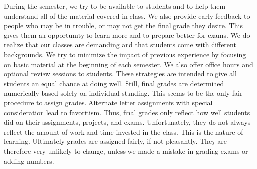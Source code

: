 \documentclass[letterpaper,11pt]{article}
\begin{document}
During the semester, we try to be available to students and to help them understand all of the material covered in class.
We also provide early feedback to people who may be in trouble, or may not get the final grade they desire.
This gives them an opportunity to learn more and to prepare better for exams.
We do realize that our classes are demanding and that students come with different backgrounds.
We try to minimize the impact of previous experience by focusing on basic material at the beginning of each semester.
We also offer office hours and optional review sessions to students.
These strategies are intended to give all students an equal chance at doing well.
Still, final grades are determined numerically based solely on individual standing.
This seems to be the only fair procedure to assign grades.
Alternate letter assignments with special consideration lead to favoritism.
Thus, final grades only reflect how well students did on their assignments, projects, and exams.
Unfortunately, they do not always reflect the amount of work and time invested in the class.
This is the nature of learning.
Ultimately grades are assigned fairly, if not pleasantly.
They are therefore very unlikely to change, unless we made a mistake in grading exams or adding numbers.
\end{document}
